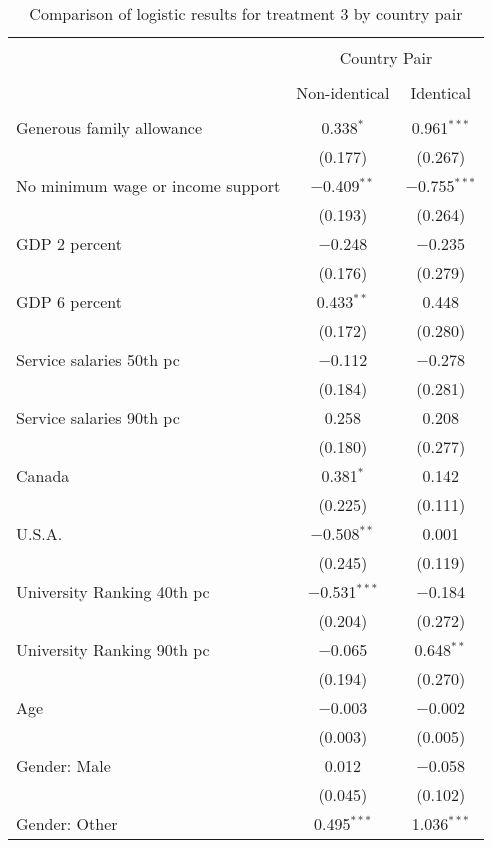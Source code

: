 \documentclass[12pt]{article}
\begin{document}
\begin{appendices}
\begin{table}[!htbp] \centering 
  \caption{Comparison of logistic results for treatment 3 by country pair} 
  \label{tab:results_samecountry}
\begin{tabular}{@{\extracolsep{5pt}}lcc} 
\\[-1.8ex]\hline 
\hline \\[-1.8ex] 
 & \multicolumn{2}{c}{Country Pair} \\ 
\cline{2-3} 
\\[-1.8ex] & Non-identical & Identical\\ 
\hline \\[-1.8ex] 
  Generous family allowance & 0.338$^{*}$ & 0.961$^{***}$ \\ 
  & (0.177) & (0.267) \\ 
  No minimum wage or income support & $-$0.409$^{**}$ & $-$0.755$^{***}$ \\ 
  & (0.193) & (0.264) \\ 
  GDP 2 percent & $-$0.248 & $-$0.235 \\ 
  & (0.176) & (0.279) \\ 
  GDP 6 percent & 0.433$^{**}$ & 0.448 \\ 
  & (0.172) & (0.280) \\ 
  Service salaries 50th pc & $-$0.112 & $-$0.278 \\ 
  & (0.184) & (0.281) \\ 
  Service salaries 90th pc & 0.258 & 0.208 \\ 
  & (0.180) & (0.277) \\ 
  Canada & 0.381$^{*}$ & 0.142 \\ 
  & (0.225) & (0.111) \\ 
  U.S.A. & $-$0.508$^{**}$ & 0.001 \\ 
  & (0.245) & (0.119) \\ 
  University Ranking 40th pc & $-$0.531$^{***}$ & $-$0.184 \\ 
  & (0.204) & (0.272) \\ 
  University Ranking 90th pc & $-$0.065 & 0.648$^{**}$ \\ 
  & (0.194) & (0.270) \\ 
  Age & $-$0.003 & $-$0.002 \\ 
  & (0.003) & (0.005) \\ 
  Gender: Male & 0.012 & $-$0.058 \\ 
  & (0.045) & (0.102) \\ 
  Gender: Other & 0.495$^{***}$ & 1.036$^{***}$ \\ 

\end{tabular}
\end{table}
\end{appendices}
\end{document}
